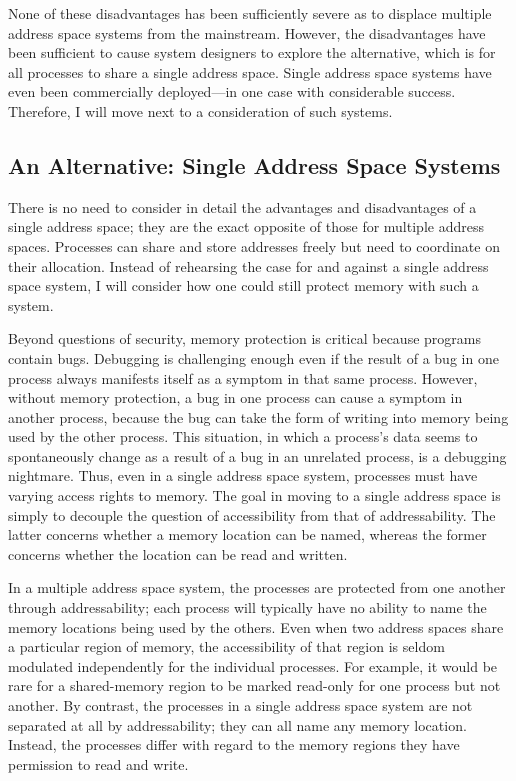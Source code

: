 None of these disadvantages has been sufficiently severe as to
displace multiple address space systems from the mainstream.  However,
the disadvantages have been sufficient to cause system designers to explore the
alternative, which is for all processes to share a single address space.
Single address space systems have
even been commercially deployed---in one case with considerable success.
Therefore, I will move next to a consideration of such systems.

\subsection{An Alternative: Single Address Space
  Systems}\label{single-address-space-subsection}

There is no need to consider in detail the advantages and
disadvantages of a single address space; they are the exact opposite
of those for multiple address spaces.  Processes can share and store
addresses freely but need to coordinate on their allocation.  Instead
of rehearsing the case for and against a single address space system,
I will consider how one could still protect memory with such a system.

Beyond questions of security, memory protection is critical because
programs contain bugs.  Debugging is challenging enough even if the
result of a bug in one process always manifests itself as a symptom in
that same process.  However, without memory protection, a bug in one
process can cause a symptom in another process, because the bug
can take the form of writing into memory being used by the other
process.  This situation, in which a process's data seems to
spontaneously change as a result of a bug in an unrelated process,
is a debugging nightmare.  Thus, even in a single address
space system, processes must have varying access rights to memory.
The goal in moving to a single address space is
simply to decouple the question of accessibility from that of
addressability.  The latter concerns whether a memory location can be
named, whereas the former concerns whether the location can be read
and written.

In a multiple address space system, the processes are protected from
one another through addressability; each process will typically have
no ability to name the memory locations being used by the others.
Even when two address spaces share a particular region of memory, the
accessibility of that region is seldom modulated independently for the
individual processes.  For example, it would be rare for a
shared-memory region to be marked read-only for one process but not
another.  By contrast, the processes in a single address space system
are not separated at all by addressability; they can all name any
memory location.  Instead, the processes differ with regard to the
memory regions they have permission to read and write.


